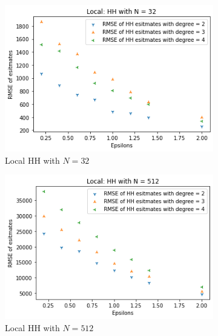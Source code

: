 \documentclass[11pt]{article}
\theoremstyle{definition}
\begin{document}
\begin{figure}[H]
     \centering
     \begin{subfigure}[b]{0.3\textwidth}
         \centering
         \includegraphics[width=\textwidth]{figures/hh_loc_epsi/hh_N=32.png}
         \caption{Local HH with $N=32$}
         \label{fig:d}
     \end{subfigure}
     \hfill
     \begin{subfigure}[b]{0.3\textwidth}
         \centering
         \includegraphics[width=\textwidth]{figures/hh_loc_epsi/hh_N=512.png}
         \caption{Local HH with $N=512$}
         \label{fig:e}
     \end{subfigure}
     \hfill
     \begin{subfigure}[b]{0.3\textwidth}
         \centering

\end{subfigure}
\end{figure}
\end{document}
